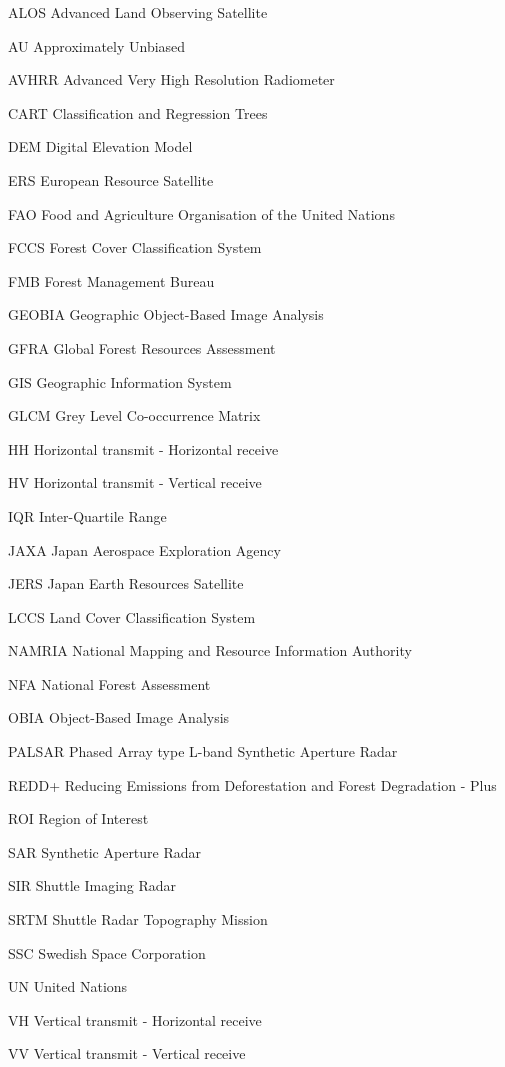 
\begin{Nomencl}[3cm]
	\item[ALOS] 	Advanced Land Observing Satellite
	\item[AU] 		Approximately Unbiased
	\item[AVHRR] 	Advanced Very High Resolution Radiometer
	\item[CART] 	Classification and Regression Trees
	\item[DEM] 		Digital Elevation Model
	\item[ERS] 		European Resource Satellite
	\item[FAO] 		Food and Agriculture Organisation of the United Nations
	\item[FCCS] 	Forest Cover Classification System
	\item[FMB] 		Forest Management Bureau
	\item[GEOBIA] 	Geographic Object-Based Image Analysis
	\item[GFRA] 	Global Forest Resources Assessment
	\item[GIS] 		Geographic Information System
	\item[GLCM] 	Grey Level Co-occurrence Matrix
	\item[HH] 		Horizontal transmit - Horizontal receive
	\item[HV] 		Horizontal transmit - Vertical receive
	\item[IQR] 		Inter-Quartile Range
	\item[JAXA] 	Japan Aerospace Exploration Agency
	\item[JERS] 	Japan Earth Resources Satellite
	\item[LCCS] 	Land Cover Classification System
	\item[NAMRIA] 	National Mapping and Resource Information Authority
	\item[NFA] 		National Forest Assessment
	\item[OBIA] 	Object-Based Image Analysis
	\item[PALSAR] 	Phased Array type L-band Synthetic Aperture Radar
	\item[REDD+] 	Reducing Emissions from Deforestation and Forest Degradation - Plus
	\item[ROI] 		Region of Interest
	\item[SAR] 		Synthetic Aperture Radar
	\item[SIR] 		Shuttle Imaging Radar
	\item[SRTM] 	Shuttle Radar Topography Mission
	\item[SSC] 		Swedish Space Corporation
	\item[UN] 		United Nations
	\item[VH] 		Vertical transmit - Horizontal receive
	\item[VV] 		Vertical transmit - Vertical receive
\end{Nomencl}
\clearpage

